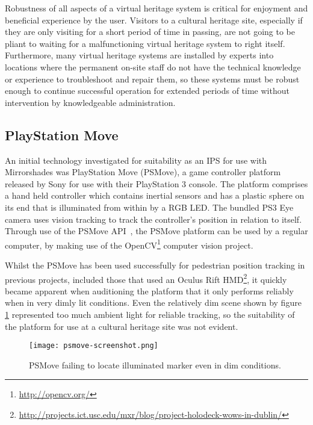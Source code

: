 Robustness of all aspects of a virtual heritage system is critical for enjoyment and beneficial experience by the user. Visitors to a cultural heritage site, especially if they are only visiting for a short period of time in passing, are not going to be pliant to waiting for a malfunctioning virtual heritage system to right itself. Furthermore, many virtual heritage systems are installed by experts into locations where the permanent on-site staff do not have the technical knowledge or experience to troubleshoot and repair them, so these systems must be robust enough to continue successful operation for extended periods of time without intervention by knowledgeable administration.



\subsection{PlayStation Move}

An initial technology investigated for suitability as an IPS for use with Mirrorshades was PlayStation Move (PSMove), a game controller platform released by Sony for use with their PlayStation 3 console. The platform comprises a hand held controller which contains inertial sensors and has a plastic sphere on its end that is illuminated from within by a RGB LED. The bundled PS3 Eye camera uses vision tracking to track the controller's position in relation to itself. Through use of the PSMove API~\cite{Perl2012}, the PSMove platform can be used by a regular computer, by making use of the OpenCV\footnote{\url{http://opencv.org/}} computer vision project.

Whilst the PSMove has been used successfully for pedestrian position tracking in previous projects, included those that used an Oculus Rift HMD\footnote{\url{http://projects.ict.usc.edu/mxr/blog/project-holodeck-wows-in-dublin/}}, it quickly became apparent when auditioning the platform that it only performs reliably when in very dimly lit conditions. Even the relatively dim scene shown by figure \ref{psmove-screenshot.png} represented too much ambient light for reliable tracking, so the suitability of the platform for use at a cultural heritage site was not evident.

\begin{figure}[h]
	\begin{center}
		\texttt{[image: psmove-screenshot.png]}
		\caption{PSMove failing to locate illuminated marker even in dim conditions.}
		\label{psmove-screenshot.png}
	\end{center}
\end{figure}

